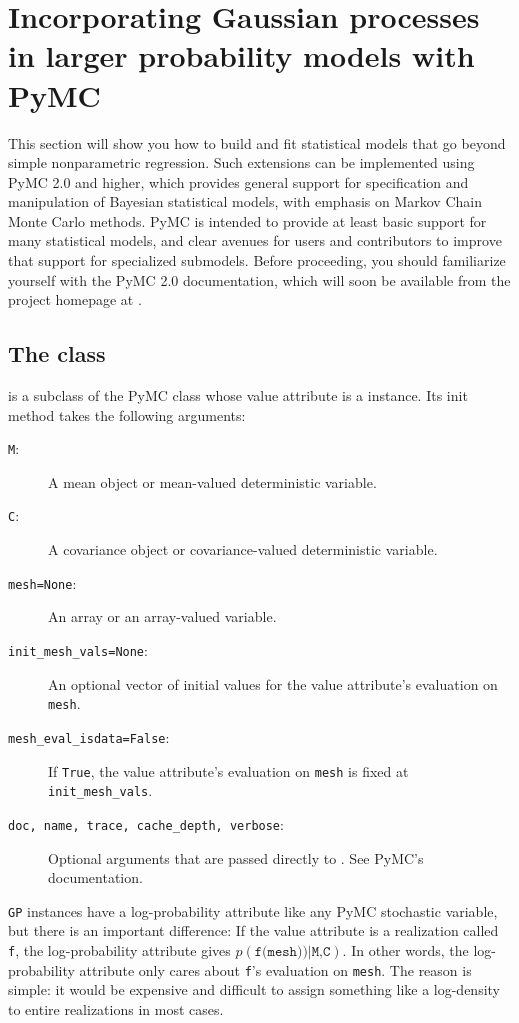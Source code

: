 \documentclass{manual}
\begin{document}
\section{Incorporating Gaussian processes in larger probability models with PyMC}\label{sec:PyMC} 

This section will show you how to build and fit statistical models that go beyond simple nonparametric regression. Such extensions can be implemented using PyMC 2.0 and higher, which provides general support for specification and manipulation of Bayesian statistical models, with emphasis on Markov Chain Monte Carlo methods. PyMC is intended to provide at least basic support for many statistical models, and clear avenues for users and contributors to improve that support for specialized submodels. Before proceeding, you should familiarize yourself with the PyMC 2.0 documentation, which will soon be available from the project homepage at .

\subsection{The  class}
 is a subclass of the PyMC  class whose value attribute is a  instance. Its init method takes the following arguments:
\begin{description}
    \item[\texttt{M}:] A mean object or mean-valued deterministic variable.
    \item[\texttt{C}:] A covariance object or covariance-valued deterministic variable.
    \item[\texttt{mesh=None}:] An array or an array-valued variable.
    \item[\texttt{init_mesh_vals=None}:] An optional vector of initial values for the value attribute's evaluation on \texttt{mesh}.
    \item[\texttt{mesh_eval_isdata=False}:] If \texttt{True}, the value attribute's evaluation on \texttt{mesh} is fixed at \texttt{init_mesh_vals}.
    \item[\texttt{doc, name, trace, cache_depth, verbose}:] Optional arguments that are passed directly to . See PyMC's documentation.
\end{description}

\texttt{GP} instances have a log-probability attribute like any PyMC stochastic variable, but there is an important difference: If the value attribute is a realization called \texttt{f}, the log-probability attribute gives $p(\texttt{f(mesh))}|\texttt{M,C})$. In other words, the log-probability attribute only cares about \texttt{f}'s evaluation on \texttt{mesh}. The reason is simple: it would be expensive and difficult to assign something like a log-density to entire realizations in most cases. 
\end{document}
